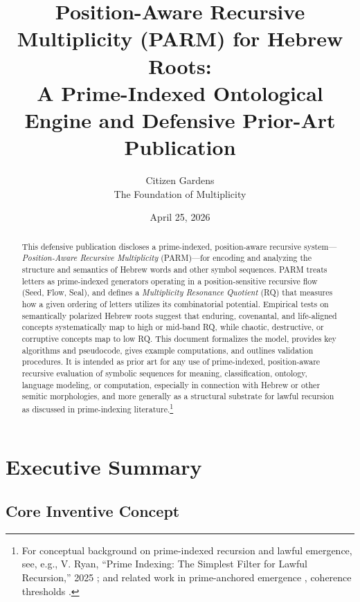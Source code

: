 \documentclass[11pt]{article}
\title{Position-Aware Recursive Multiplicity (PARM) for Hebrew Roots:\\
A Prime-Indexed Ontological Engine and Defensive Prior-Art Publication}
\author{Citizen Gardens \\ The Foundation of Multiplicity}
\date{April 25, 2026}
\begin{document}
\maketitle

\begin{abstract}
This defensive publication discloses a prime-indexed, position-aware recursive system---\emph{Position-Aware Recursive Multiplicity} (PARM)---for encoding and analyzing the structure and semantics of Hebrew words and other symbol sequences. PARM treats letters as prime-indexed generators operating in a position-sensitive recursive flow (Seed, Flow, Seal), and defines a \emph{Multiplicity Resonance Quotient} (RQ) that measures how a given ordering of letters utilizes its combinatorial potential. Empirical tests on semantically polarized Hebrew roots suggest that enduring, covenantal, and life-aligned concepts systematically map to high or mid-band RQ, while chaotic, destructive, or corruptive concepts map to low RQ. This document formalizes the model, provides key algorithms and pseudocode, gives example computations, and outlines validation procedures. It is intended as prior art for any use of prime-indexed, position-aware recursive evaluation of symbolic sequences for meaning, classification, ontology, language modeling, or computation, especially in connection with Hebrew or other semitic morphologies, and more generally as a structural substrate for lawful recursion as discussed in prime-indexing literature.\footnote{For conceptual background on prime-indexed recursion and lawful emergence, see, e.g., V. Ryan, ``Prime Indexing: The Simplest Filter for Lawful Recursion,'' 2025 \cite{primeindexing}; and related work in prime-anchored emergence \cite{primeanchor}, coherence thresholds \cite{thresholdrecursion}.}
\end{abstract}
\newpage
\tableofcontents
\newpage
\section{Executive Summary}

\subsection{Core Inventive Concept}
\end{document}
